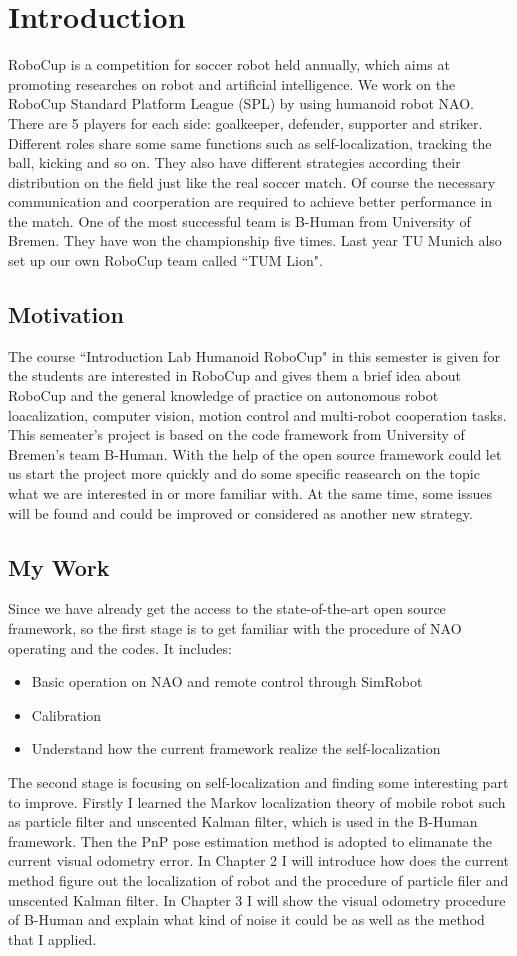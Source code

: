 \chapter{Introduction}
RoboCup is a competition for soccer robot held annually, which aims at promoting researches on robot and artificial intelligence. We work on the RoboCup Standard Platform League (SPL) by using humanoid robot NAO. There are 5 players for each side: goalkeeper, defender, supporter and striker. Different roles share some same functions such as self-localization, tracking the ball, kicking and so on. They also have different strategies according their distribution on the field just like the real soccer match. Of course the necessary communication and coorperation are required to achieve better performance in the match. One of the most successful team is B-Human from University of Bremen. They have won the championship five times. Last year TU Munich also set up our own RoboCup team called ``TUM Lion".
\section{Motivation}
The course ``Introduction Lab Humanoid RoboCup" in this semester is given for the students are interested in RoboCup and gives them a brief idea about RoboCup and the general knowledge of practice on autonomous robot loacalization, computer vision, motion control and multi-robot cooperation tasks. This semeater's project is based on the code framework from University of Bremen's team B-Human. With the help of the open source framework could let us start the project more quickly and do some specific reasearch on the topic what we are interested in or more familiar with. At the same time, some issues will be found and could be improved or considered as another new strategy.

\section{My Work}
Since we have already get the access to the state-of-the-art open source framework, so the first stage is to get familiar with the procedure of NAO operating and the codes. It includes:
\begin{itemize}
   	\item Basic operation on NAO and remote control through SimRobot
   	\item Calibration
	\item Understand how the current framework realize the self-localization
\end{itemize}

The second stage is focusing on self-localization and finding some interesting part to improve. Firstly I learned the Markov localization theory of mobile robot such as particle filter and unscented Kalman filter, which is used in the B-Human framework. Then the PnP pose estimation method is adopted to elimanate the current visual odometry error. In Chapter 2 I will introduce how does the current method figure out the localization of robot and the procedure of particle filer and unscented Kalman filter. In Chapter 3 I will show the visual odometry procedure of B-Human and explain what kind of noise it could be as well as the method that I applied.
